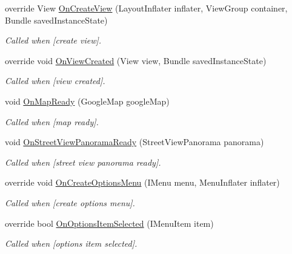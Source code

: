 \begin{DoxyCompactItemize}
override View \hyperlink{class_w_c_c_mobile_1_1_campus_map_fragment_ada9727c4138ee52355e2442046846df1}{On\+Create\+View} (Layout\+Inflater inflater, View\+Group container, Bundle saved\+Instance\+State)
\begin{DoxyCompactList}\small\item\em Called when \mbox{[}create view\mbox{]}. \end{DoxyCompactList}\item 
override void \hyperlink{class_w_c_c_mobile_1_1_campus_map_fragment_a8198ceb448fd29b291533e4deb4de3d4}{On\+View\+Created} (View view, Bundle saved\+Instance\+State)
\begin{DoxyCompactList}\small\item\em Called when \mbox{[}view created\mbox{]}. \end{DoxyCompactList}\item 
void \hyperlink{class_w_c_c_mobile_1_1_campus_map_fragment_a7b89893942f57332738e6cf84cc08301}{On\+Map\+Ready} (Google\+Map google\+Map)
\begin{DoxyCompactList}\small\item\em Called when \mbox{[}map ready\mbox{]}. \end{DoxyCompactList}\item 
void \hyperlink{class_w_c_c_mobile_1_1_campus_map_fragment_aae1f4244888a3f9077a56980d45dc004}{On\+Street\+View\+Panorama\+Ready} (Street\+View\+Panorama panorama)
\begin{DoxyCompactList}\small\item\em Called when \mbox{[}street view panorama ready\mbox{]}. \end{DoxyCompactList}\item 
override void \hyperlink{class_w_c_c_mobile_1_1_campus_map_fragment_a4eb5bcf319de03bee37353f4f7418b15}{On\+Create\+Options\+Menu} (I\+Menu menu, Menu\+Inflater inflater)
\begin{DoxyCompactList}\small\item\em Called when \mbox{[}create options menu\mbox{]}. \end{DoxyCompactList}\item 
override bool \hyperlink{class_w_c_c_mobile_1_1_campus_map_fragment_a4356e19706767f8c93a1c9861492f6c7}{On\+Options\+Item\+Selected} (I\+Menu\+Item item)
\begin{DoxyCompactList}\small\item\em Called when \mbox{[}options item selected\mbox{]}. \end{DoxyCompactList}\item 

\end{DoxyCompactItemize}
